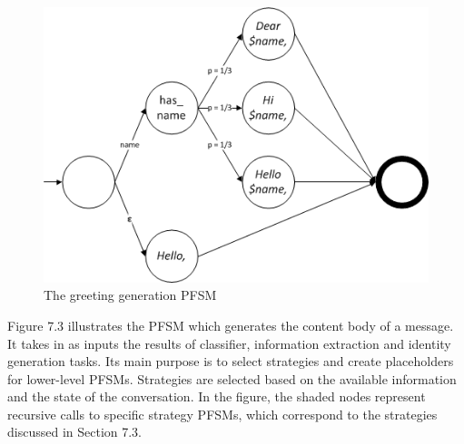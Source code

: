 \begin{figure}[h]
\centering
\includegraphics{pics/greeting-fsm.png}
\caption{The greeting generation PFSM}
\end{figure}

Figure 7.3 illustrates the PFSM which generates the content body of a message. It takes in as inputs the results of classifier, information extraction and identity generation tasks. Its main purpose is to select strategies and create placeholders for lower-level PFSMs. Strategies are selected based on the available information and the state of the conversation. In the figure, the shaded nodes represent recursive calls to specific strategy PFSMs, which correspond to the strategies discussed in Section 7.3. 

